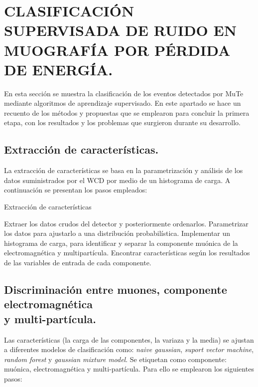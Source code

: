 \chapter{ \MakeUppercase{Clasificación supervisada de ruido en muografía por pérdida de energía.}}
\label{ch:e_rapido}

En esta sección se muestra la clasificación de los eventos detectados por MuTe mediante algoritmos de aprendizaje supervisado. En este apartado se hace un recuento de los métodos y propuestas que se emplearon para concluir la primera etapa, con los resultados y los problemas que surgieron durante su desarrollo.

\section{Extracción de características.}

La extracción de características se basa en la parametrización y análisis de los datos suministrados por el WCD por medio de un histograma de carga. A continuación se presentan los pasos empleados:

\begin{algorithm}[h]
\small
\caption{Extracción de características}
\label{Begin_Read}
\begin{algorithmic}[1]
\State Extraer los datos crudos del detector y posteriormente ordenarlos.
\State Parametrizar los datos para ajustarlo a una distribución probabilística.
\State Implementar un histograma de carga, para identificar y separar la componente muónica de la electromagnética y multipartícula.
\State Encontrar características según los resultados de las variables de entrada de cada componente.
\Statex
\end{algorithmic}
  \vspace{-0.1cm}
\end{algorithm}

 
\section{Discriminación entre muones, componente electromagnética\\ y multi-partícula.}

Las características (la carga de las componentes, la variaza y la media) se ajustan a diferentes modelos de clasificación como: \textit{naive gaussian}, \textit{suport vector machine}, \textit{random forest} y \textit{gaussian mixture model}. Se etiquetan como componente: muónica, electromagnética y multi-partícula. Para ello se emplearon los siguientes pasos:

